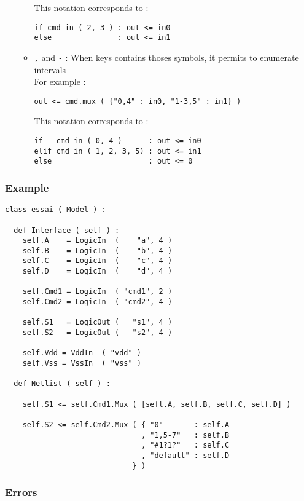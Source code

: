 \begin{itemize}
\begin{itemize}
\begin{verbatim}
        \end{verbatim}
        This notation corresponds to :
        \begin{verbatim}
if cmd in ( 2, 3 ) : out <= in0
else               : out <= in1
        \end{verbatim}
        \item \verb-,- and \verb"-" : When keys contains thoses symbols, it permits to enumerate intervals\\
        For example :
        \begin{verbatim}
out <= cmd.mux ( {"0,4" : in0, "1-3,5" : in1} )
        \end{verbatim}
        This notation corresponds to :
        \begin{verbatim}
if   cmd in ( 0, 4 )      : out <= in0
elif cmd in ( 1, 2, 3, 5) : out <= in1
else                      : out <= 0
        \end{verbatim}
    \end{itemize}
\end{itemize}
          
\subsubsection{Example}

\begin{verbatim}
class essai ( Model ) :

  def Interface ( self ) :
    self.A    = LogicIn  (    "a", 4 )
    self.B    = LogicIn  (    "b", 4 )
    self.C    = LogicIn  (    "c", 4 )
    self.D    = LogicIn  (    "d", 4 )
    
    self.Cmd1 = LogicIn  ( "cmd1", 2 )
    self.Cmd2 = LogicIn  ( "cmd2", 4 )
    
    self.S1   = LogicOut (   "s1", 4 )
    self.S2   = LogicOut (   "s2", 4 )

    self.Vdd = VddIn  ( "vdd" )
    self.Vss = VssIn  ( "vss" )
	
  def Netlist ( self ) :

    self.S1 <= self.Cmd1.Mux ( [sefl.A, self.B, self.C, self.D] ) 

    self.S2 <= self.Cmd2.Mux ( { "0"       : self.A
                               , "1,5-7"   : self.B
                               , "#1?1?"   : self.C
                               , "default" : self.D
                             } )
\end{verbatim}
    
\subsubsection{Errors}
    
